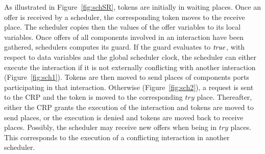 As illustrated in Figure~\ref{fig:schSR}, tokens are initially in waiting places. Once an offer
is received by a scheduler, the corresponding token moves to the receive place. The scheduler
copies then the values of the offer variables to its local variables. Once offers of all 
components involved in an interaction have been gathered, schedulers computes its guard. If 
the guard evaluates to $\textnormal{\textit{true}}$, with respect to data variables and the global scheduler clock,
the scheduler can either execute the interaction if it is not externally conflicting with
another interaction (Figure~\ref{fig:sch1}). Tokens are then moved to send places of components
ports participating in that interaction. Otherwise (Figure~\ref{fig:sch2}), 
a request is sent to the CRP and the token is moved to the
corresponding $try$ place. Thereafter, either the CRP grants the execution of the interaction
and tokens are moved to send places, or the execution is denied and tokens are moved back
to receive places. Possibly, the scheduler may receive new offers when being in $try$
places. This corresponds to the execution of a conflicting interaction in another scheduler.


